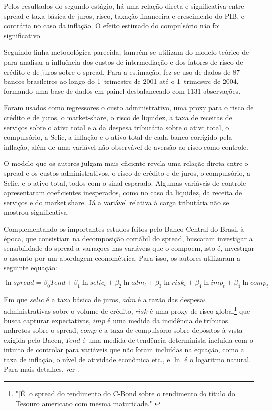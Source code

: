 \documentclass[a4paper,
               article,
               12pt,
               openany,
               oneside,
               english,
               brazil]{abntex2}
\numberwithin{equation}{section}
\begin{document}
    Pelos resultados do segundo estágio, há uma relação direta e significativa entre spread e taxa básica de juros, risco, taxação financeira e crescimento do PIB, e contrária no caso da inflação. O efeito estimado do compulsório não foi significativo.

    Seguindo linha metodológica parecida, \textcite{bignotto06} também se utilizam do modelo teórico de \textcite{hoesaunders} para analisar a influência dos custos de intermediação e dos fatores de risco de crédito e de juros sobre o spread. Para a estimação, fez-se uso de dados de 87 bancos brasileiros ao longo do 1\degrees\ trimestre de 2001 até o 1\degrees\ trimestre de 2004, formando uma base de dados em painel desbalanceado com 1131 observações.
    
    Foram usados como regressores o custo administrativo, uma proxy para o risco de crédito e de juros, o market-share, o risco de liquidez, a taxa de receitas de serviços sobre o ativo total e a da despesa tributária sobre o ativo total, o compulsório, a Selic, a inflação e o ativo total de cada banco corrigido pela inflação, além de uma variável não-observável de aversão ao risco como controle. 
    
    O modelo que os autores julgam mais eficiente revela uma relação direta entre o spread e os custos administrativos, o risco de crédito e de juros, o compulsório, a Selic, e o ativo total, todos com o sinal esperado. Algumas variáveis de controle apresentaram coeficientes inesperados, como no caso da liquidez, da receita de serviços e do market share. Já a variável relativa à carga tributária não se mostrou significativa.

    Complementando os importantes estudos feitos pelo Banco Central do Brasil à época, que consistiam na decomposição contábil do spread, \textcite{nakane02} buscaram investigar a sensibilidade do spread a variações nas variáveis que o compõem, isto é, investigar o assunto por um abordagem econométrica. Para isso, os autores utilizaram a seguinte equação:

    $$\ln spread = \beta_0Tend + \beta_1\ln selic_t + \beta_2\ln adm_t + \beta_3\ln risk_t + \beta_4\ln imp_t + \beta_4\ln comp_t$$

    Em que $ selic $ é a taxa básica de juros, $ adm $ é a razão das despesas administrativas sobre o volume de crédito, $ risk $ é uma proxy de risco global\footnote{"[É] o spread do rendimento do C-Bond sobre o rendimento do título do Tesouro americano com mesma maturidade." \cite[p.~10]{nakane02}} que busca capturar expectativas, $ imp $ é uma medida da incidência de tributos indiretos sobre o spread, $ comp $ é a taxa de compulsório sobre depósitos à vista exigida pelo Bacen, $ Tend $ é uma medida de tendência determinista incluída com o intuito de controlar para variáveis que não foram incluídas na equação, como a taxa de inflação, o nível de atividade econômica etc., e $ \ln $ é o logaritmo natural. Para mais detalhes, ver \textcite[10]{nakane02}.
\end{document}
